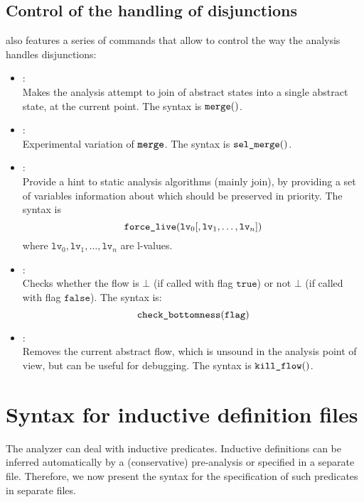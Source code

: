 \subsection{Control of the handling of disjunctions}
\memcad also features a series of commands that allow to control the
way the analysis handles disjunctions:
\begin{itemize}
\item[\dcommand{merge}] \optadv: \\
  Makes the analysis attempt to join of abstract states into a single
  abstract state, at the current point.
  The syntax is \( \texttt{merge}( ) \).
\item[\dcommand{sel\textunderscore merge}] \optdev: \\
  Experimental variation of \( \texttt{merge} \).
  The syntax is \( \texttt{sel\textunderscore merge}( ) \).
\item[\dcommand{force\textunderscore live}] \optdev: \\
  Provide a hint to static analysis algorithms (mainly join), by providing
  a set of variables information about which should be preserved in priority.
  The syntax is
  \[
  \texttt{force\_live}( \texttt{lv}_0 [, \texttt{lv}_1, \ldots,
  \texttt{lv}_n ] )
  \]
  where \( \texttt{lv}_0, \texttt{lv}_1, \ldots, \texttt{lv}_n \) are
  l-values.
\item[\dcommand{check\textunderscore bottomness}]: \\
  Checks whether the flow is \( \bot \) (if called with flag
  \( \texttt{true} \)) or not \( \bot \) (if called with flag
  \( \texttt{false} \)).
  The syntax is:
  \[
  \texttt{check\_bottomness}( \texttt{flag} )
  \]
\item[\dcommand{kill\textunderscore flow}] \optdev: \\
  Removes the current abstract flow, which is unsound in the analysis point
  of view, but can be useful for debugging.
  The syntax is \( \texttt{kill\_flow}( ) \).
\end{itemize}


\section{Syntax for inductive definition files}
\label{s:3:3:ind}
The \memcad analyzer can deal with inductive predicates.
Inductive definitions can be inferred automatically by a (conservative)
pre-analysis or specified in a separate file.
Therefore, we now present the syntax for the specification of such
predicates in separate files.

